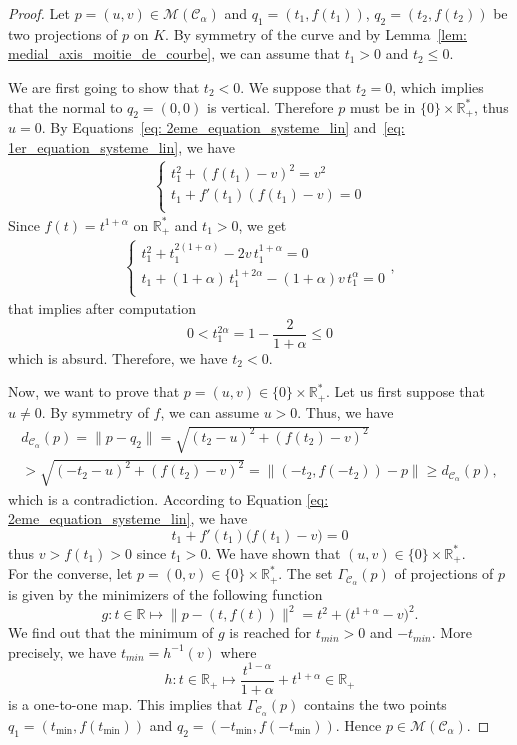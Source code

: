 \documentclass[11pt,reqno,a4paper]{article}%
\theoremstyle{definition}
\theoremstyle{remark}
\renewcommand{\leq}{\leqslant}
\renewcommand{\geq}{\geqslant}
\newcommand{\R}{\mathbb{R}}
\newcommand{\C}{\mathbb{C}}
\renewcommand{\C}{\mathcal{C}}
\begin{document}
\begin{proof}
Let $p = (u,v) \in \mathscr{M}(\C_\alpha)$ and $q_1 = (t_1 ,f(t_1))$, $q_2 = (t_2, f(t_2))$ be two projections of $p$ on $K$. By symmetry of the curve and by  Lemma~\ref{lem: medial_axis_moitie_de_courbe}, we can assume that $t_1 > 0$ and $t_2 \leq 0$.

We are first going to show that $t_2<0$. We suppose that $t_2 = 0$, which implies that the normal to $q_2 = (0,0)$ is vertical. Therefore $p$ must be in $\{0\} \times \R_+^*$, thus $u=0$. By Equations~\eqref{eq: 2eme_equation_systeme_lin} and~\eqref{eq: 1er_equation_systeme_lin}, we have 
\begin{align*}
\left\{ \begin{array}{l}
    \displaystyle t_1^2 + (f(t_1)-v)^2 =  v^2  \\
    \displaystyle t_1  + f'(t_1) (f(t_1)- v) = 0\\
\end{array} 
\right.
\end{align*}
Since  $f(t)=t^{1+\alpha}$ on $\R^*_+$ and $t_1>0$, we get
\begin{align*}
\left\{ \begin{array}{l}
    \displaystyle t_1^2 + t_1^{2(1+\alpha)}-2v \, t_1^{1+\alpha} =  0 \\
    \displaystyle t_1  + (1+ \alpha)\, t_1^{1+2\alpha} - (1+ \alpha) v \, t_1^{\alpha} = 0\\
\end{array} 
\right. ,
\end{align*}
that implies after computation
\[ 0 < t_1^{2 \alpha} = 1 - \frac{2}{1 + \alpha} \leq 0  \]
which is absurd.
Therefore, we have $t_2 < 0$. 

\noindent Now, we want to prove that $p=(u,v) \in  \{0\} \times \R_+^*$. Let us first suppose that $u \neq 0$. By symmetry of $f$, we can assume $u>0$.
Thus, we have
\begin{multline*}
d_{\C_\alpha}(p) = \| p - q_2 \| = \sqrt{(t_2-u)^2 + (f(t_2)-v)^2} \\
> \sqrt{(-t_2-u)^2 + (f(t_2)-v)^2} = \| (-t_2, f(-t_2)) -  p \| \geq d_{\C_\alpha}(p),
\end{multline*}
which is a contradiction. 
According to Equation \eqref{eq: 2eme_equation_systeme_lin}, we have
\[ t_1 + f'(t_1) \big( f(t_1) - v) = 0\]
thus $v>f(t_1)>0$ since $t_1>0$.
We have shown that $(u,v) \in  \{0\} \times \R_+^*$. \\

\noindent For the converse, let $p = (0,v) \in \{ 0 \} \times \R_+^*$. The set $\Gamma_{\C_\alpha}(p)$ of projections of $p$ is given by the minimizers of  the following function
$$ g : t \in \R \longmapsto \|p - (t,f(t))\|^2  = t^2 + \big( t^{1+\alpha} - v \big)^2.$$
We find out that the minimum of $g$ is reached for  $t_{min} > 0$ and $-t_{min}$. More precisely, we have $t_{min} = h^{-1}(v)$ where $$
h : t \in \R_+ \longmapsto \frac{t^{1-\alpha}}{1+\alpha} + t^{1+\alpha} \in \R_+
$$
is a one-to-one map.
This implies that $\Gamma_{\C_\alpha}(p)$ contains the two points $q_1 = (t_{\min},f(t_{\min}))$ and $q_2 = (-t_{\min},f(-t_{\min}))$. Hence $p\in \mathscr{M}(\C_\alpha)$.
\end{proof}
\end{document}
